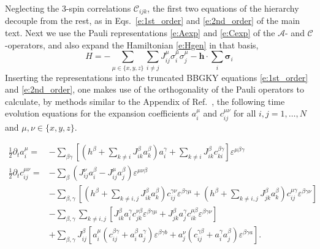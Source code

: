 \documentclass[aps,prl,showpacs,amsmath,amssymb,superscriptaddress,reprint,10pt]{revtex4-1}
\newcommand{\mvec}[1]{\boldsymbol #1}
\begin{document}
Neglecting the 3-spin correlations $\mathscr{C}_{ijk}$, the first two equations of the hierarchy decouple from the rest, as in Eqs.~\eqref{e:1st_order} and \eqref{e:2nd_order} of the main text. Next we use the Pauli representations \eqref{e:Aexp} and \eqref{e:Cexp} of the $\mathscr{A}$- and $\mathscr{C}$-operators, and also expand the Hamiltonian \eqref{e:Hgen} in that basis,
\begin{equation}
H=-\sum_{\mu\in\{x,y,z\}}\sum_{i\neq j}J_{ij}^\mu\sigma_i^\mu\sigma_j^\mu - \mvec{h}\cdot\sum_i\mvec{\sigma}_i
\end{equation}
Inserting the representations into the truncated BBGKY equations \eqref{e:1st_order} and \eqref{e:2nd_order}, one makes use of the orthogonality of the Pauli operators to calculate, by methods similar to the Appendix of Ref.~\cite{PaskauskasKastner12}, the following time evolution equations for the expansion coefficients $a_i^\mu$ and $c_{ij}^{\mu\nu}$ for all $i,j=1,\dotsc,N$ and $\mu,\nu\in\{x,y,z\}$.
\begin{widetext}
\begin{subequations}
\begin{align}
 \frac{1}{2}\partial_t a_i^\mu=&-\sum_{\beta\gamma}\left[\left(h^\beta+\sum_{k\neq i}J_{ik}^\beta a_k^\beta\right)a_i^\gamma+\sum_{k\neq i}J_{ik}^\beta c_{ki}^{\beta\gamma}\right]\varepsilon^{\mu \beta\gamma}\label{e:1st_order_param}\\
\frac{1}{2}\partial_t c_{ij}^{\mu\nu}=&-\sum_{\beta}(J_{ij}^\nu a_i^\beta-J_{ij}^\mu a_j^\beta)\varepsilon^{\mu\nu\beta}\nonumber\\
 &-\sum_{\beta,\gamma}\left[\left(h^\beta+\sum_{k\neq i,j}J_{ik}^\beta a_k^\beta\right)c_{ij}^{\gamma\nu}\varepsilon^{\beta \gamma\mu}+\left(h^\beta+\sum_{k\neq i,j}J_{jk}^\beta a_k^\beta\right) c_{ij}^{\mu \gamma}\varepsilon^{\beta \gamma\nu}\right]\nonumber\\
 &-\sum_{\beta,\gamma}\sum_{k\neq i,j}\left[J_{ik}^\beta a_i^\gamma c_{jk}^{\nu\beta}\varepsilon^{\beta \gamma\mu}+J_{jk}^\beta a_j^\gamma c_{ik}^{\mu\beta}\varepsilon^{\beta \gamma\nu}\right]\nonumber\\
 &+\sum_{\beta,\gamma}J_{ij}^\beta \left[a_i^\mu(c_{ij}^{\beta \gamma}+a_i^\beta a_j^\gamma)\varepsilon^{\beta \gamma b}+a_j^\nu(c_{ij}^{\gamma\beta}+a_i^\gamma a_j^\beta)\varepsilon^{\beta \gamma a}\right].
\label{e:2nd_order_param}
 \end{align}
\end{subequations}
 \end{widetext}
\end{document}
